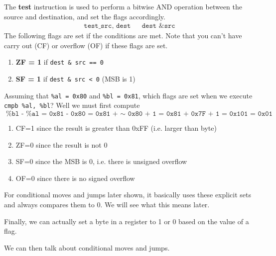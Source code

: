   \begin{definition}[Test]
    The \textbf{test} instruction is used to perform a bitwise AND operation between the source and destination, and set the flags accordingly. 
    \begin{align*}
      \texttt{test\_ src, dest} && \texttt{dest \& src} 
    \end{align*}
    The following flags are set if the conditions are met. Note that you can't have carry out (CF) or overflow (OF) if these flags are set. 
    \begin{enumerate}
      \item \textbf{ZF = 1} if \texttt{dest \& src == 0} 
      \item \textbf{SF = 1} if \texttt{dest \& src < 0} (MSB is 1) 
    \end{enumerate}
  \end{definition}

  \begin{example}[Compare] 
    Assuming that \texttt{\%al = 0x80} and \texttt{\%bl = 0x81}, which flags are set when we execute \texttt{cmpb \%al, \%bl}? Well we must first compute 
    \begin{equation}
      \texttt{\%bl - \%al = 0x81 - 0x80 = 0x81 + $\sim$ 0x80 + 1 = 0x81 + 0x7F + 1 = 0x101 = 0x01}
    \end{equation}
    \begin{enumerate}
      \item CF=1 since the result is greater than 0xFF (i.e. larger than byte) 
      \item ZF=0 since the result is not 0 
      \item SF=0 since the MSB is 0, i.e. there is unsigned overflow
      \item OF=0 since there is no signed overflow
    \end{enumerate}
  \end{example}

  For conditional moves and jumps later shown, it basically uses these explicit sets and always compares them to $0$. We will see what this means later. 

  Finally, we can actually set a byte in a register to 1 or 0 based on the value of a flag. 

  \begin{definition}[Set]
    
  \end{definition}

  We can then talk about conditional moves and jumps.  

